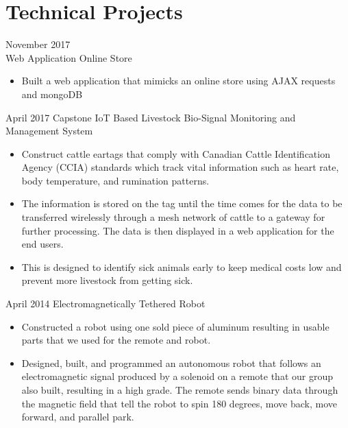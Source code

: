 \documentclass[]{friggeri-cv} %
\begin{document}
\section{Technical Projects}

\begin{entrylist}

\entry
{November 2017\\}
  {Web Application {\normalfont Online Store}}
{}
{
\begin{itemize}
\item Built a web application that mimicks an online store using AJAX requests
and mongoDB
\end{itemize}
}
\entry
{April 2017}
{Capstone {\normalfont IoT Based Livestock Bio-Signal Monitoring and Management System}}
{}
{
\begin{itemize}
\item Construct cattle eartags that comply with Canadian Cattle Identification
Agency (CCIA) standards which track vital information such as heart rate, body
temperature, and rumination patterns.
\item The information is stored on the tag until the time comes for the
data to be transferred wirelessly through a mesh network of cattle to a gateway
for further processing. The data is then displayed in a web application for the
end users.
\item This is designed to identify sick animals early to keep medical costs low
and prevent more livestock from getting sick.
\end{itemize}
}
\entry
{April 2014}
{Electromagnetically Tethered Robot}
{}
{
\begin{itemize}
\item Constructed a robot using one sold piece of aluminum resulting in usable
parts that we used for the remote and robot.
\item Designed, built, and programmed an autonomous robot that follows an
electromagnetic signal produced by a
solenoid on a remote that our group also built, resulting in a high grade. The
remote sends binary data through
the magnetic field that tell the robot to spin 180 degrees, move back, move
forward, and parallel park.
\end{itemize}
}
\end{entrylist}

\end{document}
